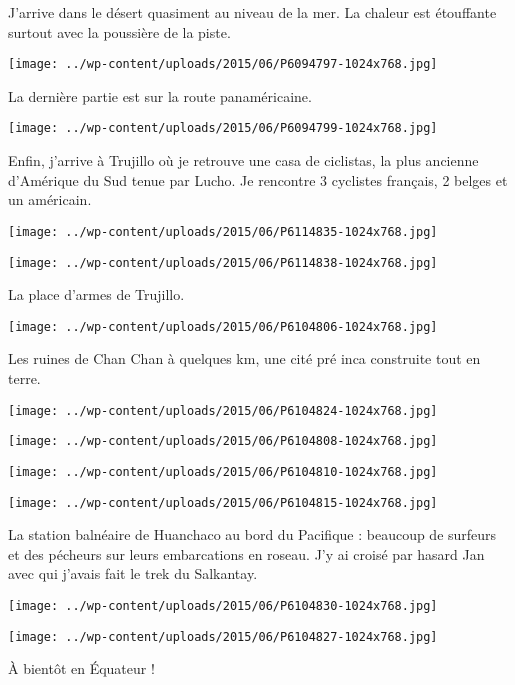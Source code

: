 J'arrive dans le désert quasiment au niveau de la mer. La chaleur est étouffante surtout avec la poussière de la piste. 
\begin{center} \texttt{[image: ../wp-content/uploads/2015/06/P6094797-1024x768.jpg]} \end{center}

\pagebreak
La dernière partie est sur la route panaméricaine. 
\begin{center} \texttt{[image: ../wp-content/uploads/2015/06/P6094799-1024x768.jpg]} \end{center}

Enfin, j'arrive à Trujillo où je retrouve une casa de ciclistas, la plus ancienne d'Amérique du Sud tenue par Lucho. Je rencontre 3 cyclistes français, 2 belges et un américain. 
\begin{center} \texttt{[image: ../wp-content/uploads/2015/06/P6114835-1024x768.jpg]} \end{center}
\begin{center} \texttt{[image: ../wp-content/uploads/2015/06/P6114838-1024x768.jpg]} \end{center}

La place d'armes de Trujillo. 
\begin{center} \texttt{[image: ../wp-content/uploads/2015/06/P6104806-1024x768.jpg]} \end{center}

\pagebreak
Les ruines de Chan Chan à quelques km, une cité pré inca construite tout en terre. 
\begin{center} \texttt{[image: ../wp-content/uploads/2015/06/P6104824-1024x768.jpg]} \end{center}
\begin{center} \texttt{[image: ../wp-content/uploads/2015/06/P6104808-1024x768.jpg]} \end{center}
\begin{center} \texttt{[image: ../wp-content/uploads/2015/06/P6104810-1024x768.jpg]} \end{center}
\begin{center} \texttt{[image: ../wp-content/uploads/2015/06/P6104815-1024x768.jpg]} \end{center}

\pagebreak
La station balnéaire de Huanchaco au bord du Pacifique : beaucoup de surfeurs et des pécheurs sur leurs embarcations en roseau. J'y ai croisé par hasard Jan avec qui j'avais fait le trek du Salkantay. 
\begin{center} \texttt{[image: ../wp-content/uploads/2015/06/P6104830-1024x768.jpg]} \end{center}
\begin{center} \texttt{[image: ../wp-content/uploads/2015/06/P6104827-1024x768.jpg]} \end{center}

\`A bientôt en Équateur !
